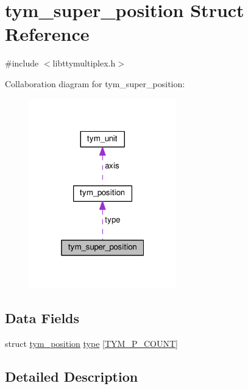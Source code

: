 \hypertarget{structtym__super__position}{}\section{tym\+\_\+super\+\_\+position Struct Reference}
\label{structtym__super__position}


{\ttfamily \#include $<$libttymultiplex.\+h$>$}



Collaboration diagram for tym\+\_\+super\+\_\+position\+:
\nopagebreak
\begin{figure}[H]
\begin{center}
\leavevmode
\includegraphics[width=181pt]{structtym__super__position__coll__graph}
\end{center}
\end{figure}
\subsection*{Data Fields}
\begin{DoxyCompactItemize}
\item 
struct \hyperlink{structtym__position}{tym\+\_\+position} \hyperlink{structtym__super__position_af5baedeebbc4d01a742503cf0536617c}{type} \mbox{[}\hyperlink{libttymultiplex_8h_a23b539c9dc1c137633f8783517fc2653a483bfa59d0a2b43731d992c418a42db7}{T\+Y\+M\+\_\+\+P\+\_\+\+C\+O\+U\+NT}\mbox{]}
\end{DoxyCompactItemize}


\subsection{Detailed Description}


